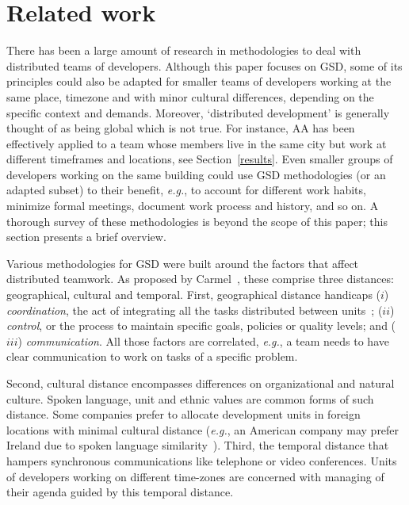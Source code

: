 \documentclass{article}
\newcommand{\eg}{{\it e.g.}}
\newcommand{\indraftnote}[1]{}
\newcommand{\todo}[1]{\indraftnote{todo: #1}}
\begin{document}
\indraftnote{TODO: cite CIA.vc bot stuff}

\section{Related work}
\label{related-work}
\nocite{gobbo:APSEEP2008}
\nocite{Reis:PhDThesis:2003}



There has been a large amount of research in methodologies to deal with
distributed teams of developers. Although this paper focuses on GSD, some of
its principles could also be adapted for smaller teams of developers working at
the same place, timezone and with minor cultural differences, depending on the
specific context and demands.  Moreover, `distributed development' is generally
thought of as being global which is not true. For instance, AA has been
effectively applied to a team whose members live in the same city but work at
different timeframes and locations, see Section~\ref{results}.  Even smaller
groups of developers working on the same building could use GSD methodologies
(or an adapted subset) to their benefit, \eg, to account for different work
habits, minimize formal meetings, document work process and history, and so on.
A thorough survey of these methodologies is beyond the scope of this paper; this
section presents a brief overview. 

Various methodologies for GSD were built around the factors that
affect distributed teamwork. As proposed by Carmel~\cite{carmel1999}, these
comprise three distances: geographical, cultural and temporal. 
First, geographical distance handicaps ($i$) \emph{coordination}, the act of
integrating all the tasks distributed between units~\cite{carmel2001}; ($ii$)
\emph{control}, or the process to maintain specific goals, policies or quality
levels; and ($iii$) \emph{communication}. All those factors are correlated, \eg,
a team needs to have clear communication to work on tasks of a specific problem.  

Second, cultural distance encompasses differences on organizational and
natural culture. Spoken language, unit and ethnic values are common
forms of such distance. Some companies prefer to allocate development
units in foreign locations with minimal cultural distance (\eg, an
American company may prefer Ireland due to spoken language
similarity~\cite{carmel2001}). Third, the temporal distance that
hampers synchronous communications like telephone or
video conferences. Units of developers working on different time-zones
are concerned with managing of their agenda guided by this temporal
distance.
\end{document}
